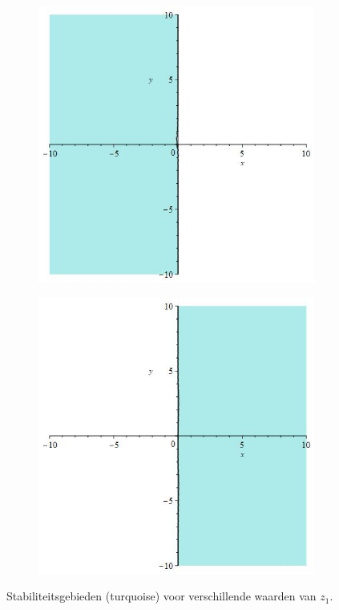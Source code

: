\documentclass[12pt]{article}
\begin{document}
\begin{figure}[H]
\begin{subfigure}{0.24\textwidth}
    \end{subfigure}
    \begin{subfigure}{0.24\textwidth}
        \includegraphics[width=0.9\linewidth]{stabrks2_4i.jpg}
    \end{subfigure}
    \begin{subfigure}{0.24\textwidth}
        \includegraphics[width=0.9\linewidth]{stabrks2_7i.jpg}
    \end{subfigure}
    \caption{Stabiliteitsgebieden (turquoise) voor verschillende waarden van \(z_1\).}
    \label{fig:stabrks2imag}
\end{figure}
\end{document}
